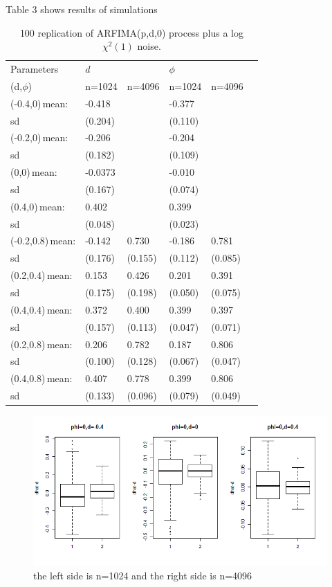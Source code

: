 \documentclass[10pt,a4paper]{article}
\begin{document}
Table 3 shows results of simulations
\begin{table}[!hbp]
\centering
\begin{tabular}{llllll}
\hline
\hline
Parameters & $d$ & $\,$ & $\phi$ & \, \\
(d,$\phi$)& n=1024& n=4096 & n=1024 & n=4096\\
\hline
(-0.4,0)\,mean:&-0.418&\,&-0.377&\,\\
sd&(0.204)&\,&(0.110)&\,\\
(-0.2,0)\,mean:&-0.206&\,&-0.204&\,\\
sd&(0.182)&\,&(0.109)&\,\\
(0,0)\,mean:&-0.0373&\,&-0.010&\,\\
sd&(0.167)&\,&(0.074)&\,\\
(0.4,0)\,mean:&0.402&\,&0.399&\,\\
sd&(0.048)&\,&(0.023)&\,\\
(-0.2,0.8)\,mean:&-0.142&0.730&-0.186& 0.781\\
sd&(0.176)&(0.155)&(0.112)&(0.085)\\
(0.2,0.4)\,mean:& 0.153&0.426& 0.201& 0.391\\
sd&(0.175)&(0.198)&(0.050)&(0.075)\\
(0.4,0.4)\,mean:& 0.372&0.400& 0.399& 0.397\\
sd&(0.157)&(0.113)&(0.047)&(0.071)\\
(0.2,0.8)\,mean:& 0.206&0.782& 0.187& 0.806\\
sd&(0.100)&(0.128)&(0.067)&(0.047)\\
(0.4,0.8)\,mean:& 0.407 & 0.778& 0.399 & 0.806\\
sd&(0.133)&(0.096)&(0.079)&(0.049)\\
\hline
\end{tabular}
\caption{100 replication of ARFIMA(p,d,0) process plus a log $\chi^2(1)$ noise.
}
\end{table}

\begin{figure}[!htb]
\centering
\includegraphics[width=14.5cm]{Rplot01}
\caption{the left side is n=1024 and the right side is n=4096}
\end{figure}
\end{document}
